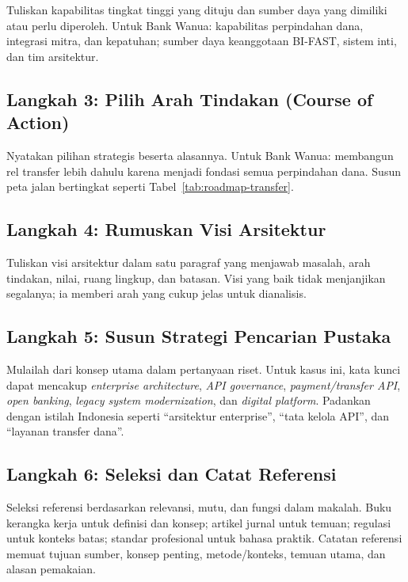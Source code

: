 Tuliskan kapabilitas tingkat tinggi yang dituju dan sumber daya yang dimiliki
atau perlu diperoleh. Untuk Bank Wanua: kapabilitas perpindahan dana, integrasi
mitra, dan kepatuhan; sumber daya keanggotaan BI-FAST, sistem inti, dan tim
arsitektur.

\subsection{Langkah 3: Pilih Arah Tindakan (Course of Action)}

Nyatakan pilihan strategis beserta alasannya. Untuk Bank Wanua: membangun rel
transfer lebih dahulu karena menjadi fondasi semua perpindahan dana. Susun peta
jalan bertingkat seperti Tabel~\ref{tab:roadmap-transfer}.

\subsection{Langkah 4: Rumuskan Visi Arsitektur}

Tuliskan visi arsitektur dalam satu paragraf yang menjawab masalah, arah
tindakan, nilai, ruang lingkup, dan batasan. Visi yang baik tidak menjanjikan
segalanya; ia memberi arah yang cukup jelas untuk dianalisis.

\subsection{Langkah 5: Susun Strategi Pencarian Pustaka}

Mulailah dari konsep utama dalam pertanyaan riset. Untuk kasus ini, kata kunci
dapat mencakup \textit{enterprise architecture}, \textit{API governance},
\textit{payment/transfer API}, \textit{open banking},
\textit{legacy system modernization}, dan \textit{digital platform}. Padankan
dengan istilah Indonesia seperti ``arsitektur enterprise'', ``tata kelola
API'', dan ``layanan transfer dana''.

\subsection{Langkah 6: Seleksi dan Catat Referensi}

Seleksi referensi berdasarkan relevansi, mutu, dan fungsi dalam makalah. Buku
kerangka kerja untuk definisi dan konsep; artikel jurnal untuk temuan; regulasi
untuk konteks batas; standar profesional untuk bahasa praktik. Catatan referensi
memuat tujuan sumber, konsep penting, metode/konteks, temuan utama, dan alasan
pemakaian.

